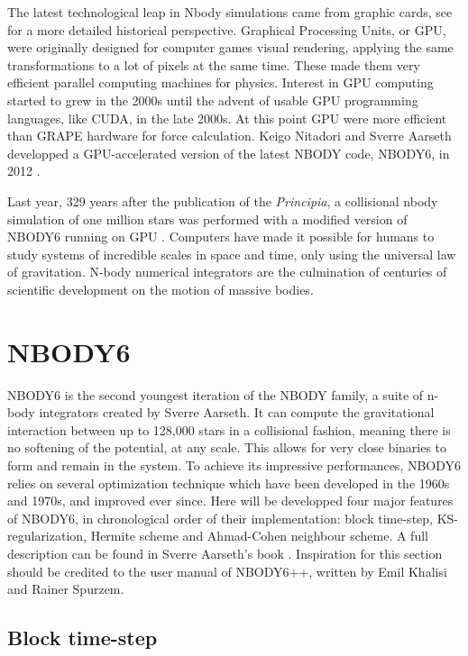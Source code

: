 The latest technological leap in Nbody simulations came from graphic cards, see \cite{Bedorf2012} for a more detailed historical perspective. Graphical Processing Units, or GPU, were originally designed for computer games visual rendering, applying the same transformations to a lot of pixels at the same time. These made them very efficient parallel computing machines for physics. Interest in GPU computing started to grew in the 2000s \citep{Nyland2004,Elsen2006,SPZ2007} until the advent of usable GPU programming languages, like CUDA, in the late 2000s. At this point GPU were more efficient than GRAPE hardware for force calculation. Keigo Nitadori and Sverre Aarseth developped a GPU-accelerated version of the latest NBODY code, NBODY6, in 2012 \citep{Nitadori2012}.

Last year, 329 years after the publication of the \textit{Principia}, a collisional nbody simulation of one million stars was performed with a modified version of NBODY6 running on GPU \citep{Wang2015}. Computers have made it possible for humans to study systems of incredible scales in space and time, only using the universal law of gravitation. N-body numerical integrators are the culmination of centuries of scientific development on the motion of massive bodies.

\newpage
\section{NBODY6}


NBODY6 is the second youngest iteration of the NBODY family, a suite of n-body integrators created by Sverre Aarseth. It can compute the gravitational interaction between up to 128,000 stars in a collisional fashion, meaning there is no softening of the potential, at any scale. This allows for very close binaries to form and remain in the system. To achieve its impressive performances, NBODY6 relies on several optimization technique which have been developed in the 1960s and 1970s, and improved ever since. Here will be developped four major features of NBODY6, in chronological order of their implementation: block time-step, KS-regularization, Hermite scheme and Ahmad-Cohen neighbour scheme. A full description can be found in Sverre Aarseth's book \citep{Aarseth2003}. Inspiration for this section should be credited to the user manual of NBODY6++, written by Emil Khalisi and Rainer Spurzem.

\subsection{Block time-step}
 
